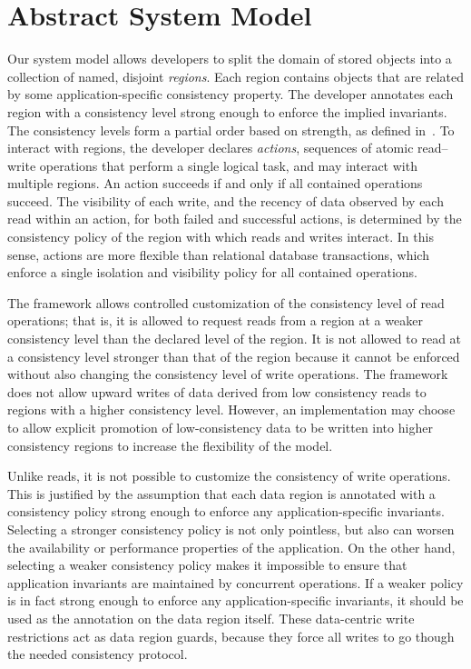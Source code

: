 \documentclass[preprint,numbers]{sigplanconf}
\begin{document}
\section{Abstract System Model}
\label{sec:model}
Our system model allows developers to split the domain of stored objects into a
collection of named, disjoint
\emph{regions}. Each
region contains objects that are related by some application-specific consistency property. The
developer annotates each region with a consistency level 
strong enough to enforce the implied invariants. The consistency levels form
a partial order
based on strength, as defined
in~\cite{sivaramakrishnan2015declarative}.
To interact with regions, the developer
declares \emph{actions}, sequences of atomic
read--write operations that perform a single logical task, and may interact with
multiple regions. An action succeeds if and only if all contained operations
succeed. The visibility of each write, and the recency of
data observed by each read within an action, for both failed and successful
actions, is determined by the consistency policy of the region with which reads
and writes interact. In this sense, actions are more flexible than relational
database transactions, which enforce a single isolation and visibility policy for all contained
operations.

The framework allows controlled customization of 
the consistency level of read operations; that is, it is allowed to request
reads from a region at a weaker consistency level than the declared level of
the region. It is not allowed to read
at a consistency level stronger than that of the region
because it cannot be enforced without also changing the consistency
level of write operations.
The framework does not allow
upward writes of data derived from low
consistency reads to regions with a higher consistency level.
%
However, an implementation may choose to
allow explicit promotion of low-consistency data to be written into higher
consistency regions to increase the flexibility of the model.

Unlike reads, it is not possible to customize the consistency of write
operations. This is justified
by the assumption that each data region is annotated with a consistency policy strong enough to enforce 
any application-specific invariants. Selecting a stronger
consistency policy is not only pointless, but also can worsen
the availability or performance properties of the application. On the other hand,
selecting a weaker consistency policy makes it impossible to ensure that
application invariants are maintained by concurrent
operations. If a weaker policy is in fact strong enough to enforce any
application-specific
invariants, it should be used as the annotation on the data region itself. 
These data-centric write restrictions act as data region guards, because they force all writes to go
though the needed consistency protocol.
\end{document}
